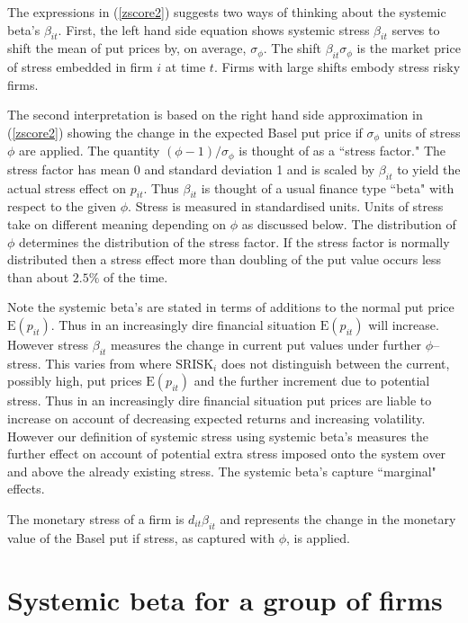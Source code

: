 \documentclass[authoryear]{elsarticle}
\newcommand{\E}{\mathrm{E}}
\newcommand{\eref}[1]{(\ref{#1})}
\begin{document}
The expressions in \eref{zscore2} suggests two ways of  thinking about the  systemic beta's  $\beta_{it}$.   First, the left hand side equation shows systemic stress $\beta_{it}$ serves to shift the mean of put prices  by, on average, $\sigma_\phi$.   The shift $\beta_{it}\sigma_\phi$ is the market price of stress embedded in firm $i$ at time $t$.   Firms with large shifts embody stress risky firms.

The second interpretation is based on  the right hand side approximation in \eref{zscore2} showing   the change in the  expected Basel put price if  $\sigma_\phi$ units of stress $\phi$ are applied.  The quantity $(\phi-1)/\sigma_\phi$ is thought of as a ``stress factor."   The stress factor has mean 0 and standard deviation 1 and is scaled by $\beta_{it}$ to yield the actual stress effect on  $p_{it}$.  Thus  $\beta_{it}$ is thought of a usual finance type ``beta" with respect to the given $\phi$.   Stress is measured in standardised units.  Units of stress take on different meaning depending on  $\phi$ as discussed below. The distribution of $\phi$ determines the distribution of the stress factor. If the stress factor is normally distributed then a stress effect more than doubling of the put value  occurs less than about $2.5\%$ of the time. 

Note the systemic beta's are stated in terms of additions to the normal put price $\E(p_{it})$. Thus in an increasingly dire financial situation $\E(p_{it})$ will increase.   However stress $\beta_{it}$ measures the  change in current put values  under  further $\phi$--stress.  This varies from  \cite{brownlees2015} where $\mathrm{SRISK}_i$ does not distinguish between the current, possibly high, put prices $\E(p_{it})$ and the further increment due to potential stress.   Thus in an increasingly dire financial situation put prices are liable to increase on account of decreasing expected returns and increasing volatility.   However our definition of systemic stress using systemic beta's measures the further effect on account of potential extra stress imposed onto the system over and above the already existing stress.   The systemic beta's capture   ``marginal" effects.        

The  monetary stress of a firm is 
$
d_{it}\beta_{it}
$
and represents the change in the monetary value of the Basel put  if stress, as captured with $\phi$, is applied. 





\section{Systemic beta for a group of firms}
\end{document}
